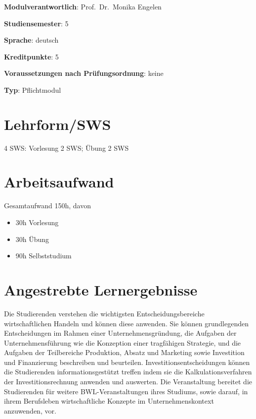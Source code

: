 \begin{modulHead}
\textbf{Modulverantwortlich}: Prof.~Dr.~Monika
Engelen
\end{modulHead}
\begin{modulHead}
\textbf{Studiensemester}:
5
\end{modulHead}
\begin{modulHead}
\textbf{Sprache}:
deutsch
\end{modulHead}
\begin{modulHead}
\textbf{Kreditpunkte}:
5
\end{modulHead}
\begin{modulHead}
\textbf{Voraussetzungen nach
Prüfungsordnung}: keine
\end{modulHead}
\begin{modulHead}
\textbf{Typ}:
Pflichtmodul
\end{modulHead}


\section*{Lehrform/SWS\label{/mi-2017/modulbeschreibungen-bachelor/BA_BWL1}}\label{lehrformswspathlabelmi-2017modulbeschreibungen-bachelorbaux5fbwl1}

4 SWS: Vorlesung 2 SWS; Übung 2 SWS

\section*{Arbeitsaufwand\label{/mi-2017/modulbeschreibungen-bachelor/BA_BWL1}}\label{arbeitsaufwandpathlabelmi-2017modulbeschreibungen-bachelorbaux5fbwl1}

Gesamtaufwand 150h, davon

\begin{itemize}
\tightlist
\item
  30h Vorlesung
\item
  30h Übung
\item
  90h Selbststudium
\end{itemize}

\section*{Angestrebte
Lernergebnisse\label{/mi-2017/modulbeschreibungen-bachelor/BA_BWL1}}\label{angestrebte-lernergebnissepathlabelmi-2017modulbeschreibungen-bachelorbaux5fbwl1}

Die Studierenden verstehen die wichtigsten Entscheidungsbereiche
wirtschaftlichen Handeln und können diese anwenden. Sie können
grundlegenden Entscheidungen im Rahmen einer Unternehmensgründung, die
Aufgaben der Unternehmensführung wie die Konzeption einer tragfähigen
Strategie, und die Aufgaben der Teilbereiche Produktion, Absatz und
Marketing sowie Investition und Finanzierung beschreiben und beurteilen.
Investitionsentscheidungen können die Studierenden informationsgestützt
treffen indem sie die Kalkulationsverfahren der Investitionsrechnung
anwenden und auswerten. Die Veranstaltung bereitet die Studierenden für
weitere BWL-Veranstaltungen ihres Studiums, sowie darauf, in ihrem
Berufsleben wirtschaftliche Konzepte im Unternehmenskontext anzuwenden,
vor.

